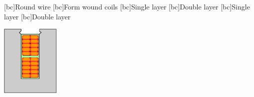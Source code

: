 \begin{psfrags}%
\psfragscanon

[bc]{{\tiny Round wire}}
[bc]{{\tiny Form wound coils}}
[bc]{{\tiny Single layer}}
[bc]{{\tiny Double layer}}
[bc]{{\tiny Single layer}}
[bc]{{\tiny Double layer}}

\includegraphics[width=0.21\textwidth]{figs/f_insulation_d.eps}
\end{psfrags}%